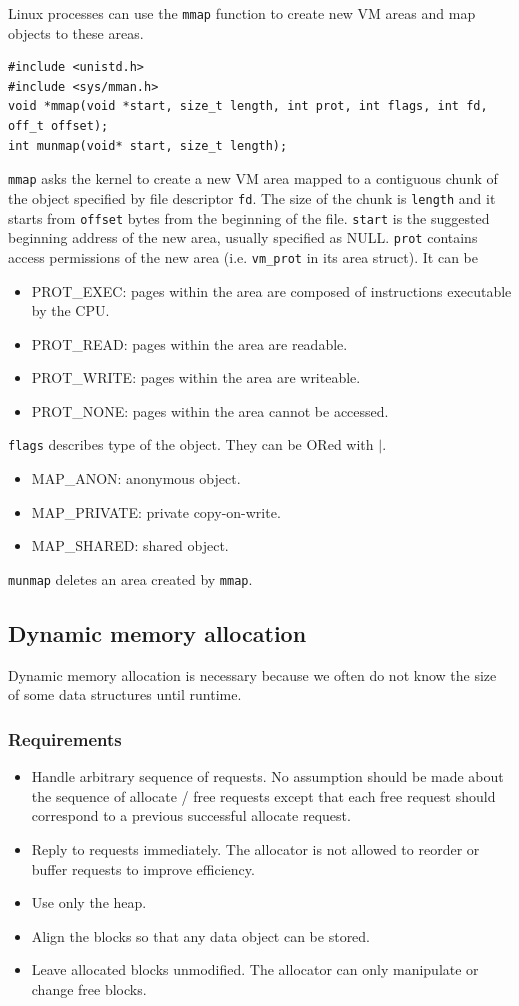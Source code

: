 Linux processes can use the \texttt{mmap} function to create new VM areas and map objects to these areas. 
\begin{lstlisting}[frame=single]
#include <unistd.h>
#include <sys/mman.h>
void *mmap(void *start, size_t length, int prot, int flags, int fd, off_t offset);
int munmap(void* start, size_t length);
\end{lstlisting}
\texttt{mmap} asks the kernel to create a new VM area mapped to a contiguous chunk of the object specified by file descriptor \texttt{fd}. The size of the chunk is \texttt{length} and it starts from \texttt{offset} bytes from the beginning of the file. \texttt{start} is the suggested beginning address of the new area, usually specified as NULL. \texttt{prot} contains access permissions of the new area (i.e. \texttt{vm\_prot} in its area struct). It can be 
\begin{itemize}
	\item PROT\_EXEC: pages within the area are composed of instructions executable by the CPU. 
	\item PROT\_READ: pages within the area are readable.
	\item PROT\_WRITE: pages within the area are writeable.
	\item PROT\_NONE: pages within the area cannot be accessed. 
\end{itemize}
\texttt{flags} describes type of the object. They can be ORed with $|$.
\begin{itemize}
	\item MAP\_ANON: anonymous object.
	\item MAP\_PRIVATE: private copy-on-write.
	\item MAP\_SHARED: shared object. 
\end{itemize}
\texttt{munmap} deletes an area created by \texttt{mmap}.
\subsection{Dynamic memory allocation}
Dynamic memory allocation is necessary because we often do not know the size of some data structures until runtime. 
\subsubsection{Requirements}
\begin{itemize}
	\item Handle arbitrary sequence of requests. No assumption should be made about the sequence of allocate / free requests except that each free request should correspond to a previous successful allocate request.
	\item Reply to requests immediately. The allocator is not allowed to reorder or buffer requests to improve efficiency.
	\item Use only the heap.
	\item Align the blocks so that any data object can be stored.
	\item Leave allocated blocks unmodified. The allocator can only manipulate or change free blocks.
\end{itemize}
